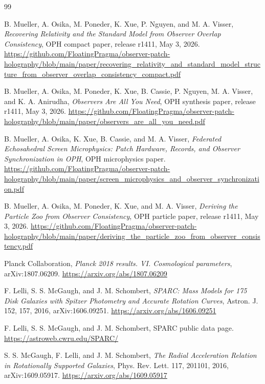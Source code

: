 \documentclass[11pt]{article}
\begin{document}
\begin{thebibliography}{99}

B. Mueller, A. Osika, M. Poneder, K. Xue, P. Nguyen, and M. A. Visser,
\emph{Recovering Relativity and the Standard Model from Observer Overlap Consistency},
OPH compact paper, release r1411, May 3, 2026.
\url{https://github.com/FloatingPragma/observer-patch-holography/blob/main/paper/recovering_relativity_and_standard_model_structure_from_observer_overlap_consistency_compact.pdf}

B. Mueller, A. Osika, M. Poneder, K. Xue, B. Cassie, P. Nguyen, M. A. Visser, and K. A. Anirudha,
\emph{Observers Are All You Need}, OPH synthesis paper, release r1411,
May 3, 2026.
\url{https://github.com/FloatingPragma/observer-patch-holography/blob/main/paper/observers_are_all_you_need.pdf}

B. Mueller, A. Osika, K. Xue, B. Cassie, and M. A. Visser,
\emph{Federated Echosahedral Screen Microphysics: Patch Hardware, Records, and Observer Synchronization in OPH},
OPH microphysics paper.
\url{https://github.com/FloatingPragma/observer-patch-holography/blob/main/paper/screen_microphysics_and_observer_synchronization.pdf}

B. Mueller, A. Osika, M. Poneder, K. Xue, and M. A. Visser,
\emph{Deriving the Particle Zoo from Observer Consistency},
OPH particle paper, release r1411, May 3, 2026.
\url{https://github.com/FloatingPragma/observer-patch-holography/blob/main/paper/deriving_the_particle_zoo_from_observer_consistency.pdf}

Planck Collaboration,
\emph{Planck 2018 results. VI. Cosmological parameters},
arXiv:1807.06209.
\url{https://arxiv.org/abs/1807.06209}

F. Lelli, S. S. McGaugh, and J. M. Schombert,
\emph{SPARC: Mass Models for 175 Disk Galaxies with Spitzer Photometry and Accurate Rotation Curves},
Astron. J. 152, 157, 2016, arXiv:1606.09251.
\url{https://arxiv.org/abs/1606.09251}

F. Lelli, S. S. McGaugh, and J. M. Schombert,
SPARC public data page.
\url{https://astroweb.cwru.edu/SPARC/}

S. S. McGaugh, F. Lelli, and J. M. Schombert,
\emph{The Radial Acceleration Relation in Rotationally Supported Galaxies},
Phys. Rev. Lett. 117, 201101, 2016, arXiv:1609.05917.
\url{https://arxiv.org/abs/1609.05917}


\end{thebibliography}
\end{document}
